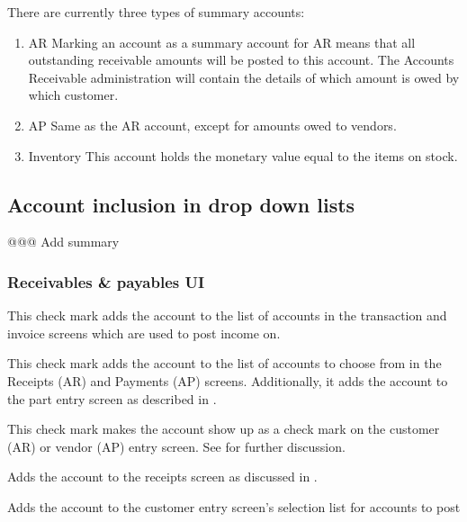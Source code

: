 There are currently three types of summary accounts:

\begin{enumerate}
\item AR Marking an account as a summary account for AR means that all outstanding
   receivable amounts will be posted to this account. The Accounts Receivable administration
   will contain the details of which amount is owed by which \gls{customer}.
\item AP Same as the AR account, except for amounts owed to vendors.
\item Inventory This account holds the monetary value equal to the items on stock.
\end{enumerate}

\subsection{Account inclusion in drop down lists}
\label{subsec-coa-account-links}
@@@ Add summary

\subsubsection{Receivables \& payables UI}
\label{subsubsec-coa-AR-AP-checkmarks}

\begin{description}[style=nextline]
\item[Income (AR\_amount)] This check mark adds the account to the list of accounts
   in the transaction and invoice screens which are used to post income on.
\item[Payment (AR\_paid)] This check mark adds the account to the list of accounts
   to choose from in the Receipts (AR) and Payments (AP) screens. Additionally, it
   adds the account to the part entry screen as described in .
\item[Tax (AR\_tax)] This check mark makes the account show up as a check mark on the
   \gls{customer} (AR) or vendor (AP) entry screen. See  for further discussion.
\item[Overpayment (AR\_overpayment)] Adds the account to the receipts screen as discussed
   in .
\item[Discount (AR\_discount)] Adds the account to the customer entry screen's selection
   list for accounts to post 
\end{description}

